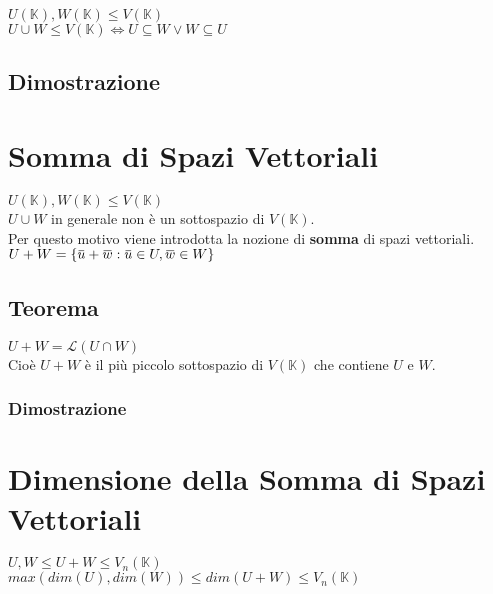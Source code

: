 \documentclass[a4paper, twoside, italian, 11pt]{book}
\newcommand{\braces}[1] {\left \{ #1 \right \}}
\newcommand{\overbar}[1] {\mkern 1.5mu\overline{\mkern-1.5mu#1\mkern-1.5mu}\mkern 1.5mu}
\newcommand{\K}{\mathbb K}
\begin{document}
$U(\K), W(\K) \leq V(\K)$ \\

\noindent
$U \cup W  \leq V(\K) \iff U \subseteq W \lor W \subseteq U$


\subsection{Dimostrazione}




\section{Somma di Spazi Vettoriali}

$U(\K), W(\K) \leq V(\K)$ \\

\noindent
$U \cup W$ in generale non è un sottospazio di $V(\K)$. \\
Per questo motivo viene introdotta la nozione di \textbf{somma} di spazi vettoriali. \\

\noindent
$U + W = \braces{\overbar u + \overbar w : \overbar u \in U, \overbar w \in W}$


\subsection{Teorema}

$U + W  = \mathcal L (U \cap W)$ \\

\noindent
Cioè $U + W$ è il più piccolo sottospazio di $V(\K)$ che contiene $U$ e $W$.


\subsubsection{Dimostrazione}




\section{Dimensione della Somma di Spazi Vettoriali}

$U, W \leq U + W \leq V_n(\K)$ \\

\noindent
$max(dim(U), dim(W)) \leq dim(U + W) \leq V_n(\K)$
\end{document}
